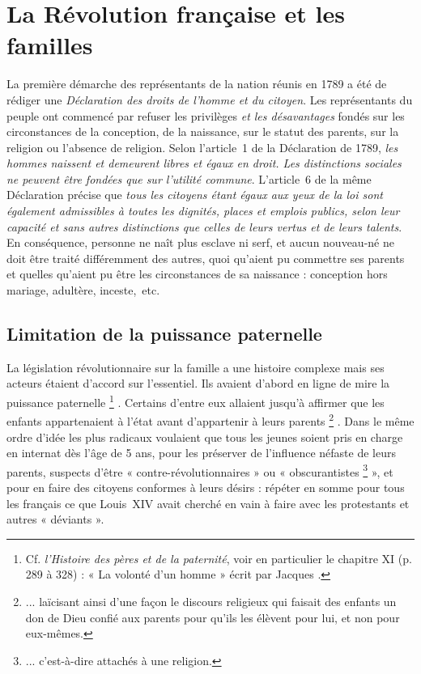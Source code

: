 

\chapter{La Révolution française et les familles}


 La première démarche des représentants de la nation réunis en 1789 a été de rédiger une \emph{Déclaration des droits de l'homme et du citoyen}. Les représentants du peuple ont commencé par refuser les privilèges \emph{et les désavantages} fondés sur les circonstances de la conception, de la naissance, sur le statut des parents, sur la religion ou l'absence de religion. Selon l'article~1 de la Déclaration de 1789, \emph{les hommes naissent et demeurent libres et égaux en droit. Les distinctions sociales ne peuvent être fondées que sur l'utilité commune}. L'article~6 de la même Déclaration précise que \emph{tous les citoyens étant égaux aux yeux de la loi sont également admissibles à toutes les dignités, places et emplois publics, selon leur capacité et sans autres distinctions que celles de leurs vertus et de leurs talents}. En conséquence, personne ne naît plus esclave ni serf, et aucun nouveau-né ne doit être traité différemment des autres, quoi qu'aient pu commettre ses parents et quelles qu'aient pu être les circonstances de sa naissance : conception hors mariage, adultère, inceste,~etc. 


\section{Limitation de la puissance paternelle}

 La législation révolutionnaire sur la famille a une histoire complexe mais ses acteurs étaient d'accord sur l'essentiel. Ils avaient d'abord en ligne de mire la puissance paternelle%
\footnote{Cf. \emph{l'Histoire des pères et de la paternité}, voir en particulier le chapitre XI (p. 289 à 328) : « La volonté d'un homme » écrit par Jacques .}%
. Certains d'entre eux allaient jusqu'à affirmer que les enfants appartenaient à l'état avant d'appartenir à leurs parents%
\footnote{... laïcisant ainsi d'une façon le discours religieux qui faisait des enfants un don de Dieu confié aux parents pour qu'ils les élèvent pour lui, et non pour eux-mêmes.}%
. Dans le même ordre d'idée les plus radicaux voulaient que tous les jeunes soient pris en charge en internat dès l'âge de 5 ans, pour les préserver de l'influence néfaste de leurs parents, suspects d'être {« contre-révolutionnaires »} ou « {obscurantistes}%
\footnote{... c'est-à-dire attachés à une religion.} 
», et pour en faire des citoyens conformes à leurs désirs : répéter en somme pour tous les français ce que Louis~XIV avait cherché en vain à faire avec les protestants et autres « déviants ».

